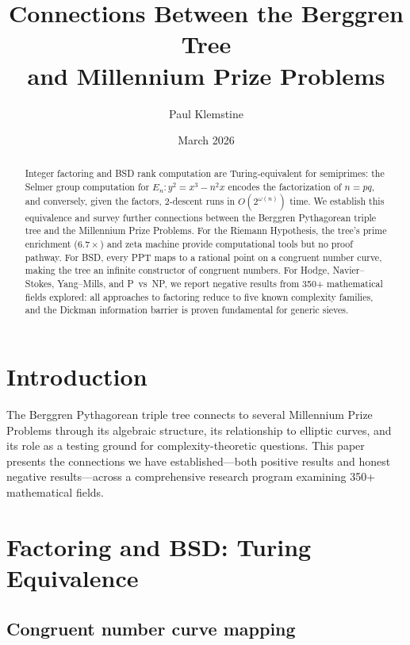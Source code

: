 \documentclass[12pt]{amsart}
\title{Connections Between the Berggren Tree\\
and Millennium Prize Problems}
\author{Paul Klemstine}
\date{March 2026}
\theoremstyle{definition}
\theoremstyle{remark}
\begin{document}
\begin{abstract}
Integer factoring and BSD rank computation are Turing-equivalent for
semiprimes: the Selmer group computation for $E_n : y^2 = x^3 - n^2 x$
encodes the factorization of $n = pq$, and conversely, given the factors,
$2$-descent runs in $O(2^{\omega(n)})$ time. We establish this equivalence
and survey further connections between the Berggren Pythagorean triple tree
and the Millennium Prize Problems. For the Riemann Hypothesis, the tree's
prime enrichment ($6.7\times$) and zeta machine provide computational tools
but no proof pathway. For BSD, every PPT maps to a rational point on a
congruent number curve, making the tree an infinite constructor of congruent
numbers. For Hodge, Navier--Stokes, Yang--Mills, and P~vs~NP, we report
negative results from 350+ mathematical fields explored: all approaches to
factoring reduce to five known complexity families, and the Dickman
information barrier is proven fundamental for generic sieves.
\end{abstract}

\maketitle

\section{Introduction}\label{sec:intro}

The Berggren Pythagorean triple tree connects to several Millennium Prize
Problems through its algebraic structure, its relationship to elliptic curves,
and its role as a testing ground for complexity-theoretic questions. This
paper presents the connections we have established---both positive results
and honest negative results---across a comprehensive research program
examining 350+ mathematical fields.

\section{Factoring and BSD: Turing Equivalence}\label{sec:bsd}

\subsection{Congruent number curve mapping}
\end{document}
